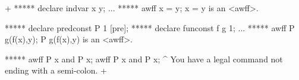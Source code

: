 



\gfexample+
   ***** declare indvar x y;
   ...
   ***** awff x = y;
   x = y is an <awff>.

   ***** declare predconst P 1 [pre];
   ***** declare funconst f g 1;
   ...
   ***** awff P g(f(x),y);
   P g(f(x),y) is an <awff>.

   ***** awff P x and P x;
   awff P x and P x;
                ^
   You have a legal command not ending with a semi-colon.
+